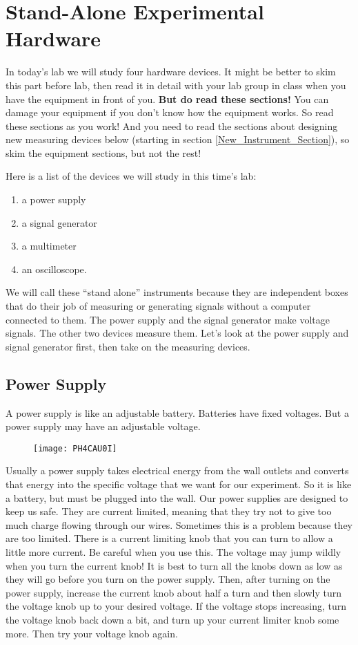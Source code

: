 \section{Stand-Alone Experimental Hardware}

In today's lab we will study four hardware devices. It might be better to skim this part before lab, then read it in detail with your lab group in class when you have the equipment in front of you. \textbf{But do read these sections!} You can damage your equipment if you don't know how the equipment works. So read these sections as you work! And you need to read the sections about  designing new measuring devices below (starting in section \ref*{New_Instrument_Section}), so skim the equipment sections, but not the rest!

Here is a list of the devices we will study in this time's lab:
\begin{enumerate} 
	\item a power supply
	\item a signal generator
	\item a multimeter
	\item an oscilloscope.
\end{enumerate}

We will call these ``stand alone'' instruments because they are independent boxes that do their job of measuring or generating signals without a computer connected to them. The power supply and the signal generator make voltage signals. The other two devices measure them. Let's look at the power supply and signal generator first, then take on the measuring devices.

\subsection{Power Supply}

A power supply is like an adjustable battery. Batteries have fixed voltages. But a power supply may have an adjustable voltage. 

\begin{figure}[h!]
	\centering
	\texttt{[image: PH4CAU0I]}
\end{figure}

Usually a power supply takes electrical energy from the wall outlets and converts that energy into the specific voltage that we want for our experiment. So it is like a battery, but must be plugged into the wall. Our power supplies are designed to keep us safe. They are current limited, meaning that they try not to give too much charge flowing through our wires. Sometimes this is a problem
because they are too limited. There is a current limiting knob that you can turn to allow a little more current. Be careful when you use this. The voltage may jump wildly when you turn the current knob! It is best to turn all the knobs down as low as they will go before you turn on the power
supply. Then, after turning on the power supply, increase the current knob about half a turn and then slowly turn the voltage knob up to your desired voltage. If the voltage stops increasing, turn the voltage knob back down a bit, and turn up your current limiter knob some more. Then try your voltage knob again.


